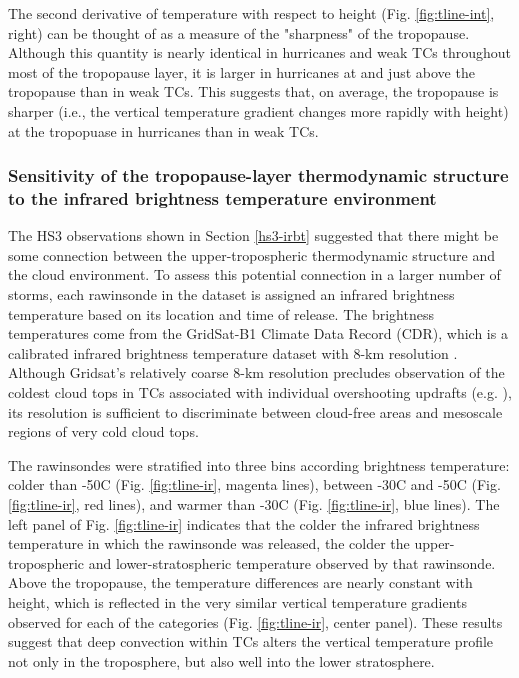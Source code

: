 The second derivative of temperature with respect to height (Fig. \ref{fig:tline-int}, right) can be thought of as a measure of the "sharpness" of the tropopause.
Although this quantity is nearly identical in hurricanes and weak TCs throughout most of the tropopause layer, it is larger in hurricanes at and just above the tropopause than in weak TCs.
This suggests that, on average, the tropopause is sharper (i.e., the vertical temperature gradient changes more rapidly with height) at the tropopuase in hurricanes than in weak TCs.

\subsubsection{Sensitivity of the tropopause-layer thermodynamic structure to the infrared brightness temperature environment}
The HS3 observations shown in Section \ref{hs3-irbt} suggested that there might be some connection between the upper-tropospheric thermodynamic structure and the cloud environment.
To assess this potential connection in a larger number of storms, each rawinsonde in the dataset is assigned an infrared brightness temperature based on its location and time of release.
The brightness temperatures come from the GridSat-B1 Climate Data Record (CDR), which is a calibrated infrared brightness temperature dataset with 8-km resolution \cite{Knappetal2011}.
Although Gridsat's relatively coarse 8-km resolution precludes observation of the coldest cloud tops in TCs associated with individual overshooting updrafts (e.g. \citeauthor{Griffin2017} \citeyear{Griffin2017}), its resolution is sufficient to discriminate between cloud-free areas and mesoscale regions of very cold cloud tops.

The rawinsondes were stratified into three bins according brightness temperature: colder than -50\textdegree{}C (Fig. \ref{fig:tline-ir}, magenta lines), between -30\textdegree{}C and -50\textdegree{}C (Fig. \ref{fig:tline-ir}, red lines), and warmer than -30\textdegree{}C (Fig. \ref{fig:tline-ir}, blue lines).
The left panel of Fig. \ref{fig:tline-ir} indicates that the colder the infrared brightness temperature in which the rawinsonde was released, the colder the upper-tropospheric and lower-stratospheric temperature observed by that rawinsonde.
Above the tropopause, the temperature differences are nearly constant with height, which is reflected in the very similar vertical temperature gradients observed for each of the categories (Fig. \ref{fig:tline-ir}, center panel).
These results suggest that deep convection within TCs alters the vertical temperature profile not only in the troposphere, but also well into the lower stratosphere.



